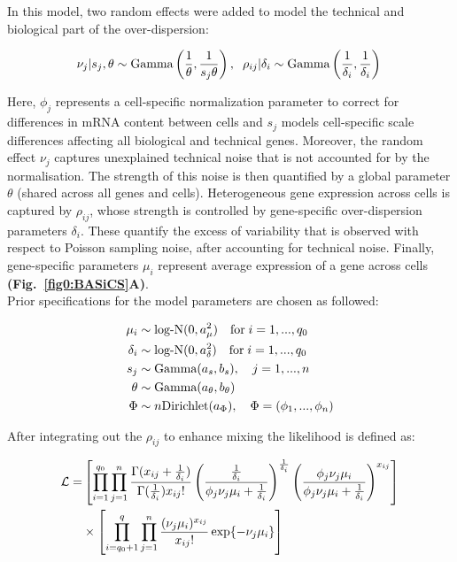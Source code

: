 In this model, two random effects were added to model the technical and biological part of the over-dispersion:

\begin{equation} 
\nu_j|s_j,\theta \sim \textnormal{Gamma}\left(\frac{1}{\theta},\frac{1}{s_j\theta}\right), \hspace{0.2cm} \rho_{ij}|\delta_i  \sim \textnormal{Gamma}\left(\frac{1}{\delta_i},\frac{1}{\delta_i}\right)\\
\end{equation} 

Here, $\phi_j$ represents a cell-specific normalization parameter to correct for differences in mRNA content between cells and $s_j$ models cell-specific scale differences affecting all biological and technical genes. Moreover, the random effect $\nu_j$ captures unexplained technical noise that is not accounted for by the normalisation. The strength of this noise is then quantified by a global parameter $\theta$ (shared across all genes and cells). Heterogeneous gene expression across cells is captured by $\rho_{ij}$, whose strength is controlled by gene-specific over-dispersion parameters $\delta_i$. These quantify the excess of variability that is observed with respect to Poisson sampling noise, after accounting for technical noise. Finally, gene-specific parameters $\mu_i$ represent average expression of a gene across cells \textbf{(Fig.~\ref{fig0:BASiCS}A)}. \\

Prior specifications for the model parameters are chosen as followed:

\begin{align*}
\mu_i&\sim\textnormal{log-N}(0,a_\mu^2) \quad \textnormal{for}\;{}i=1,...,q_0\\
\delta_i&\sim\textnormal{log-N}(0,a_\delta^2) \quad \textnormal{for}\;{}i=1,...,q_0\\
s_j&\sim\textnormal{Gamma}(a_s,b_s), \quad j=1,...,n\\
\theta&\sim\textnormal{Gamma}(a_\theta,b_\theta)\\
\Phi&\sim{}n\textnormal{Dirichlet}(a_\Phi), \quad \Phi=(\phi_1,...,\phi_n)
\end{align*}

After integrating out the $\rho_{ij}$ to enhance mixing \citep{Vallejos2015BASiCS} the likelihood is defined as:

\begin{align} 
\mathcal{L} = & \left[\prod_{i=1}^{q_0}\prod_{j=1}^n\frac{\Gamma(x_{ij}+\frac{1}{\delta_i})}{\Gamma(\frac{1}{\delta_i})x_{ij}!}\left(\frac{\frac{1}{\delta_i}}{\phi_j\nu_j\mu_i+\frac{1}{\delta_i}}\right)^\frac{1}{\delta_i}\left(\frac{\phi_j\nu_j\mu_i}{\phi_j\nu_j\mu_i+\frac{1}{\delta_i}}\right)^{x_{ij}}\right] \nonumber\\ 
&\times\left[\prod_{i=q_0+1}^{q}\prod_{j=1}^n\frac{(\nu_j\mu_i)^{x_{ij}}}{x_{ij}!}\exp\lbrace-\nu_j\mu_i\rbrace\right]
\end{align} 

